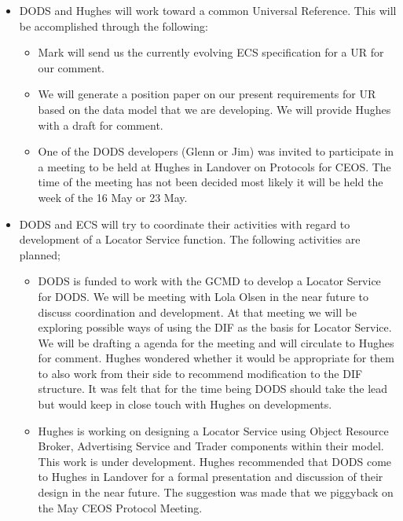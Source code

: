 \begin{itemize}  
  \item DODS and Hughes will work toward a common Universal Reference.  This
will be accomplished through the following: 
    \begin{itemize}

      \item  Mark will send us the currently evolving ECS specification for a
UR for our comment. 
      \item  We will generate a position paper on our present requirements
for UR based on the data model that we are developing.  We will provide
Hughes with a draft for comment.
      \item One of the DODS developers (Glenn or Jim) was invited to
participate in a meeting to be held at Hughes in Landover on Protocols for
CEOS. The time of the meeting has not been decided most likely it will be
held the week of the 16 May or 23 May.

    \end{itemize}

  \item  DODS and ECS will try to coordinate their activities with regard to
development of a Locator Service function.  The following activities are
planned;
    \begin{itemize}
      
      \item DODS is funded to work with the GCMD to develop a Locator Service
for DODS.  We will be meeting with Lola Olsen in the near future to discuss
coordination and development.  At that meeting we will be exploring possible
ways of using the DIF as the basis for Locator Service.  We will be drafting
a agenda for the meeting and will circulate to Hughes for comment.
Hughes wondered whether it would be appropriate for them to also work
from their side to recommend modification to the DIF structure.  It
was felt that for the time being DODS should take the lead but would
keep in close touch with Hughes on developments.

     \item Hughes is working on designing a Locator Service using  Object
Resource Broker, Advertising Service  and Trader components within their
model.  This work is under development.  Hughes recommended that DODS come to
Hughes in Landover for a formal presentation and discussion of their design
in the near future.  The suggestion was made that we piggyback on the May
CEOS Protocol Meeting.  

    \end{itemize}
\end{itemize}

